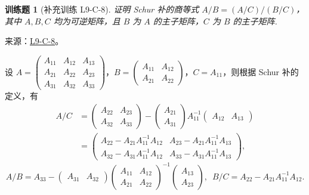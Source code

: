 \documentclass[UTF8,12pt,a4paper,fontset=fandol]{ctexart}
\newtheorem{exercise}{训练题}[section]
\begin{document}
\begin{exercise}[补充训练 L9-C-8]\label{prob:L9-C-8}
证明 Schur 补的商等式 $A/B=(A/C)/(B/C)$，其中 $A,B,C$ 均为可逆矩阵，且 $B$ 为 $A$ 的主子矩阵，$C$ 为 $B$ 的主子矩阵.
\end{exercise}
\noindent 来源：\href{https://github.com/yhwu-is/Linear-Algebra-Left-Undone/blob/new/%E8%AE%B2%E4%B9%89/%E4%B8%93%E9%A2%98/9%20%E7%9F%A9%E9%98%B5%E8%BF%90%E7%AE%97%E8%BF%9B%E9%98%B6.tex}{L9-C-8}。
\begin{solve}
设 $A = \begin{pmatrix}
                    A_{11} & A_{12} & A_{13} \\
                    A_{21} & A_{22} & A_{23} \\
                    A_{31} & A_{32} & A_{33}
                \end{pmatrix}$，$B = \begin{pmatrix}
                    A_{11} & A_{12} \\
                    A_{21} & A_{22}
                \end{pmatrix}$，$C = A_{11}$，则根据 Schur 补的定义，有
                \begin{align*}
                    A/C &= \begin{pmatrix}
                        A_{22} & A_{23} \\
                        A_{32} & A_{33}
                    \end{pmatrix} - \begin{pmatrix}
                        A_{21} \\ A_{31}
                    \end{pmatrix} A_{11}^{-1} \begin{pmatrix}
                        A_{12} & A_{13}
                    \end{pmatrix} \\
                    &= \begin{pmatrix}
                        A_{22} - A_{21} A_{11}^{-1} A_{12} & A_{23} - A_{21} A_{11}^{-1} A_{13} \\
                        A_{32} - A_{31} A_{11}^{-1} A_{12} & A_{33} - A_{31} A_{11}^{-1} A_{13}
                    \end{pmatrix},
                \end{align*}
                \[
                    A/B = A_{33} - \begin{pmatrix}
                        A_{31} & A_{32}
                    \end{pmatrix} \begin{pmatrix}
                        A_{11} & A_{12} \\
                        A_{21} & A_{22}
                    \end{pmatrix}^{-1} \begin{pmatrix}
                        A_{13} \\ A_{23}
                    \end{pmatrix}, \enspace
                    B/C = A_{22} - A_{21} A_{11}^{-1} A_{12}.
                \]


\end{solve}
\end{document}
